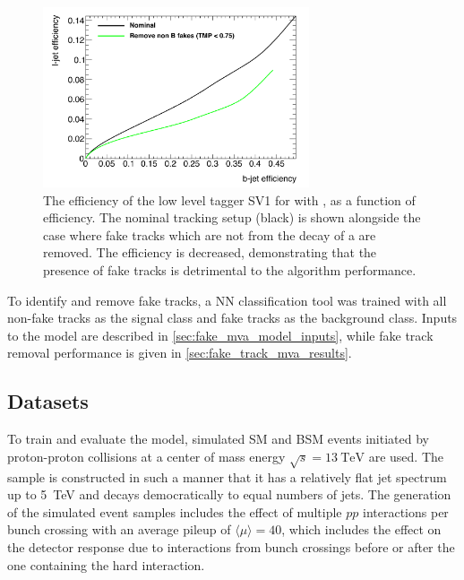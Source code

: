 \begin{figure}[!htbp]
    \centering
    \includegraphics[width=0.7\textwidth]{chapters/track_classifier/figs/sv1_perf_nofake.pdf}
    \caption{
      The \ljet efficiency of the low level tagger SV1 for \Zprimejets with \Zprimept, as a function of \bjet efficiency.
      The nominal tracking setup (black) is shown alongside the case where fake tracks which are not from the decay of a \bhadron are removed.
      The \ljet efficiency is decreased, demonstrating that the presence of fake tracks is detrimental to the algorithm performance.
    }
    \label{fig:sv1_perf_nofake}
\end{figure}

To identify and remove fake tracks, a NN classification tool was trained with all non-fake tracks as the signal class and fake tracks as the background class.
Inputs to the model are described in \cref{sec:fake_mva_model_inputs}, while fake track removal performance is given in \cref{sec:fake_track_mva_results}.


\subsection{Datasets}\label{sec:track_classifier_datasets}

To train and evaluate the model, simulated SM \ttbar and BSM \Zprime events initiated by proton-proton collisions at a center of mass energy $\sqrt{s} = \SI{13}{\TeV}$ are used.
The \Zprime sample is constructed in such a manner that it has a relatively flat jet \pt spectrum up to \SI{5}{\TeV} and decays democratically to equal numbers of \bcl jets.
The generation of the simulated event samples includes the effect of multiple $pp$ interactions per bunch crossing with an average pileup of $\langle \mu \rangle = 40$, which includes the effect on the detector response due to interactions from bunch crossings before or after the one containing the hard interaction.

